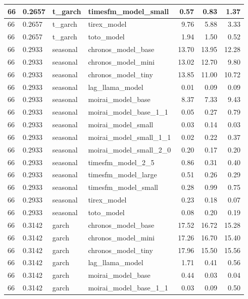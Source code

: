 {\begin{tabular}{llllrrr}
66 & 0.2657 & t\_garch & timesfm\_model\_small & 0.57 & 0.83 & 1.37 \\
\midrule
66 & 0.2657 & t\_garch & tirex\_model & 9.76 & 5.88 & 3.33 \\
\midrule
66 & 0.2657 & t\_garch & toto\_model & 1.94 & 1.50 & 0.52 \\
\midrule
66 & 0.2933 & seasonal & chronos\_model\_base & 13.70 & 13.95 & 12.28 \\
\midrule
66 & 0.2933 & seasonal & chronos\_model\_mini & 13.02 & 12.70 & 9.80 \\
\midrule
66 & 0.2933 & seasonal & chronos\_model\_tiny & 13.85 & 11.00 & 10.72 \\
\midrule
66 & 0.2933 & seasonal & lag\_llama\_model & 0.01 & 0.09 & 0.09 \\
\midrule
66 & 0.2933 & seasonal & moirai\_model\_base & 8.37 & 7.33 & 9.43 \\
\midrule
66 & 0.2933 & seasonal & moirai\_model\_base\_1\_1 & 0.05 & 0.27 & 0.79 \\
\midrule
66 & 0.2933 & seasonal & moirai\_model\_small & 0.03 & 0.14 & 0.03 \\
\midrule
66 & 0.2933 & seasonal & moirai\_model\_small\_1\_1 & 0.02 & 0.22 & 0.37 \\
\midrule
66 & 0.2933 & seasonal & moirai\_model\_small\_2\_0 & 0.20 & 0.17 & 0.20 \\
\midrule
66 & 0.2933 & seasonal & timesfm\_model\_2\_5 & 0.86 & 0.31 & 0.40 \\
\midrule
66 & 0.2933 & seasonal & timesfm\_model\_large & 0.51 & 0.26 & 0.29 \\
\midrule
66 & 0.2933 & seasonal & timesfm\_model\_small & 0.28 & 0.99 & 0.75 \\
\midrule
66 & 0.2933 & seasonal & tirex\_model & 0.23 & 0.18 & 0.07 \\
\midrule
66 & 0.2933 & seasonal & toto\_model & 0.08 & 0.20 & 0.19 \\
\midrule
66 & 0.3142 & garch & chronos\_model\_base & 17.52 & 16.72 & 15.28 \\
\midrule
66 & 0.3142 & garch & chronos\_model\_mini & 17.26 & 16.70 & 15.40 \\
\midrule
66 & 0.3142 & garch & chronos\_model\_tiny & 17.96 & 15.50 & 15.56 \\
\midrule
66 & 0.3142 & garch & lag\_llama\_model & 1.71 & 0.41 & 0.56 \\
\midrule
66 & 0.3142 & garch & moirai\_model\_base & 0.44 & 0.03 & 0.04 \\
\midrule
66 & 0.3142 & garch & moirai\_model\_base\_1\_1 & 0.03 & 0.09 & 0.50 \\

\end{tabular}}
